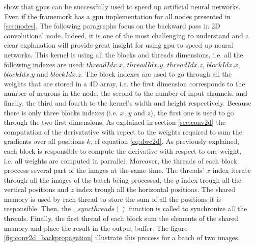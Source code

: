 \documentclass[11pt]{report}
\begin{document}
\noindent \textcite{DBLP:journals/tjs/BritoFCSWMF16} show that \acrshort{gpu}s can be successfully used to speed up artificial neural networks. Even if the framemork has a \acrshort{gpu} implementation for all nodes presented in \ref{sec:nodes}. The following paragraphs focus on the backward pass in 2D convolutional node. Indeed, it is one of the most challenging to understand and a clear explanation will provide great insight for using \acrshort{gpu} to speed up neural networks. This kernel is using all the blocks and threads dimensions, i.e. all the following indexes are used: $threadIdx.x$, $threadIdx.y$, $threadIdx.z$, $blockIdx.x$, $blockIdx.y$ and $blockIdx.z$. The block indexes are used to go through all the weights that are stored in a 4D array, i.e. the first dimension corresponds to the number of neurons in the node, the second to the number of input channels, and finally, the third and fourth to the kernel's width and height respectively. Because there is only three blocks indexes (i.e. $x$, $y$ and $z$), the first one is used to go through the two first dimensions. As explained in section \ref{sec:conv2d} the computation of the derivatative with repect to the weights required to sum the gradients over all positions $k$, cf equation \ref{eq:dwc2d}. As previously explained, each block is responsible to compute the derivative with respect to one weight, i.e. all weights are computed in parrallel. Moreover, the threads of each block proccess several part of the images at the same time. The threads' $x$ index iterate through all the images of the batch being processed, the $y$ index trough all the vertical positions and $z$ index trough all the horizontal positions. The shared memory is used by each thread to store the sum of all the positions it is responsible. Then, the $\_\_syncthreads()$ function is called to synchronize all the threads. Finally, the first thread of each block sum the elements of the shared memory and place the result in the output buffer. The figure \ref{fig:conv2d_backpropagation} illustrate this process for a batch of two images.
\end{document}
